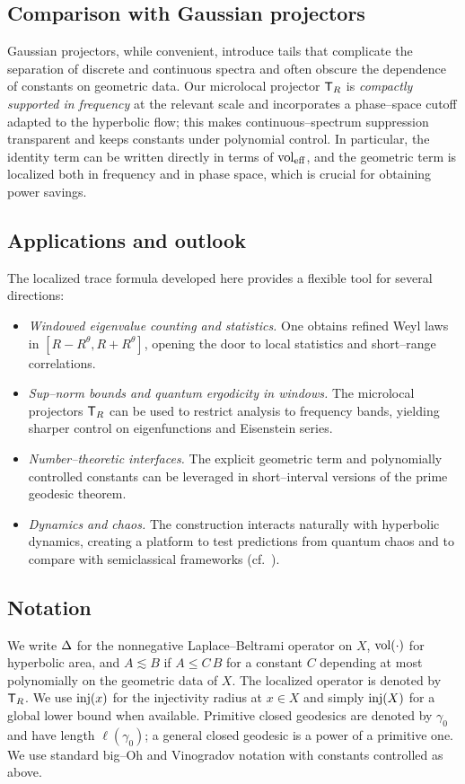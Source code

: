 \subsection{Comparison with Gaussian projectors}\label{subsec:gaussian}
Gaussian projectors, while convenient, introduce tails that complicate the separation of
discrete and continuous spectra and often obscure the dependence of constants on
geometric data. Our microlocal projector $\mathsf{T}_R$ is \emph{compactly supported in frequency}
at the relevant scale and incorporates a phase--space cutoff adapted to the hyperbolic
flow; this makes continuous--spectrum suppression transparent and keeps constants under
polynomial control. In particular, the identity term can be written directly in terms of
$\operatorname{vol}_{\mathrm{eff}}$, and the geometric term is localized both in frequency and in phase
space, which is crucial for obtaining power savings.

\subsection{Applications and outlook}\label{subsec:applications}
The localized trace formula developed here provides a flexible tool for several
directions:
\begin{itemize}
  \item \emph{Windowed eigenvalue counting and statistics.} One obtains refined Weyl laws
        in $[R-R^\theta,R+R^\theta]$, opening the door to local statistics and short--range
        correlations.
  \item \emph{Sup--norm bounds and quantum ergodicity in windows.} The microlocal
        projectors $\mathsf{T}_R$ can be used to restrict analysis to frequency bands, yielding
        sharper control on eigenfunctions and Eisenstein series.
  \item \emph{Number--theoretic interfaces.} The explicit geometric term and polynomially
        controlled constants can be leveraged in short--interval versions of the prime
        geodesic theorem.
  \item \emph{Dynamics and chaos.} The construction interacts naturally with hyperbolic
        dynamics, creating a platform to test predictions from quantum chaos and to
        compare with semiclassical frameworks (cf.~\cite{zworski2012,dyatlovzworski2019}).
\end{itemize}

\subsection{Notation}\label{subsec:notation}
We write $\Delta$ for the nonnegative Laplace--Beltrami operator on $X$, $\operatorname{vol}(\cdot)$ for
hyperbolic area, and $A\lesssim B$ if $A\le C\,B$ for a constant $C$ depending at most
polynomially on the geometric data of $X$. The localized operator is denoted by $\mathsf{T}_R$.
We use $\mathrm{inj}(x)$ for the injectivity radius at $x\in X$ and simply $\mathrm{inj}(X)$ for a
global lower bound when available. Primitive closed geodesics are denoted by $\gamma_0$
and have length $\ell(\gamma_0)$; a general closed geodesic is a power of a primitive
one. We use standard big--Oh and Vinogradov notation with constants controlled as above.

